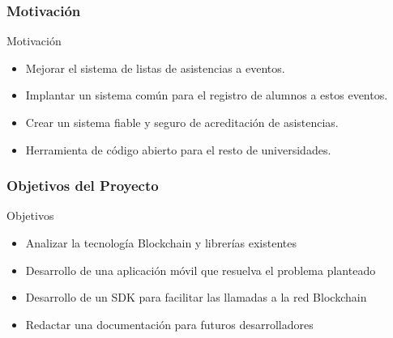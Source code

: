 \documentclass[usenames,dvipsnames]{beamer}
\begin{document}
\begin{frame} 
\frametitle{Motivación} 
  \begin{block}{Motivación}
    \begin{itemize}
      \item Mejorar el sistema de listas de asistencias a eventos.
      \item Implantar un sistema común para el registro de alumnos a estos eventos.
      \item Crear un sistema fiable y seguro de acreditación de asistencias.
      \item Herramienta de código abierto para el resto de universidades.
    \end{itemize}
  \end{block} 
\end{frame}

\begin{frame} 
\frametitle{Objetivos del Proyecto} 
  \begin{block}{Objetivos}
    \begin{itemize}
      \item Analizar la tecnología Blockchain y librerías existentes
      \item Desarrollo de una aplicación móvil que resuelva el problema planteado
      \item Desarrollo de un SDK para facilitar las llamadas a la red Blockchain
      \item Redactar una documentación para futuros desarrolladores
    \end{itemize}
  \end{block}
\end{frame}


\end{document}
